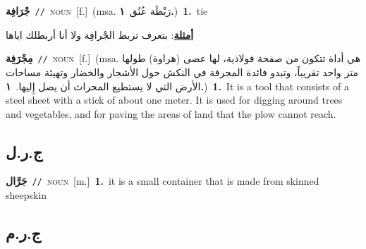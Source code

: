 \documentclass[10pt,a4paper,twoside]{article} %
\begin{document}
\begin{multicols}{2}
{\setlength\topsep{0pt}\textbf{\foreignlanguage{arabic}{جْرَافِة}}\ {\color{gray}\texttt{//}\color{black}}\ \textsc{noun}\ [f.]\ \color{gray}(msa. \foreignlanguage{arabic}{رَبْطَة عُنُق}~\foreignlanguage{arabic}{\textbf{١.}})\color{black}\ \textbf{1.}~tie\  \begin{flushright}\color{gray}\foreignlanguage{arabic}{\textbf{\underline{\foreignlanguage{arabic}{أمثلة}}}: بتعرف تربط الجْرافِة ولا أنا أربطلك اياها}\end{flushright}\color{black}} \vspace{2mm}

{\setlength\topsep{0pt}\textbf{\foreignlanguage{arabic}{مِجْرَفِة}}\ {\color{gray}\texttt{//}\color{black}}\ \textsc{noun}\ [f.]\ \color{gray}(msa. \foreignlanguage{arabic}{هي أداة تتكون من صفحة فولاذية، لها عصى (هراوة) طولها متر واحد تقريباً، وتبدو فائدة المجرفة في النكش حول الأشجار والخضار وتهيئة مساحات الأرض التي لا يستطيع المحراث أن يصل إِليها.}~\foreignlanguage{arabic}{\textbf{١.}})\color{black}\ \textbf{1.}~It is a tool that consists of a steel sheet with a stick of about one meter. It is used for digging around trees and vegetables, and for paving the areas of land that the plow cannot reach.\ } \vspace{2mm}

\vspace{-3mm}
\subsection*{\color{blue}\foreignlanguage{arabic}{ج.ر.ل}\color{blue}{}} 

{\setlength\topsep{0pt}\textbf{\foreignlanguage{arabic}{جَرَّال}}\ {\color{gray}\texttt{//}\color{black}}\ \textsc{noun}\ [m.]\ \textbf{1.}~it is a small container that is made from skinned sheepskin\ } \vspace{2mm}

\vspace{-3mm}
\subsection*{\color{blue}\foreignlanguage{arabic}{ج.ر.م}\color{blue}{}} 


\end{multicols}
\end{document}
